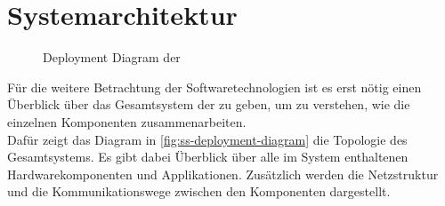 \chapter{Systemarchitektur}
\label{chap:systemarchitektur}

\begin{figure}
    \centering
    
    \caption{Deployment Diagram der \shst{}}
    \label{fig:ss-deployment-diagram}
\end{figure}

Für die weitere Betrachtung der Softwaretechnologien ist es erst nötig einen Überblick über 
das Gesamtsystem der \shst{} zu geben, um zu verstehen, wie die einzelnen Komponenten
zusammenarbeiten.\\
Dafür zeigt das Diagram in \autoref{fig:ss-deployment-diagram} die Topologie des Gesamtsystems.
Es gibt dabei Überblick über alle im System enthaltenen Hardwarekomponenten und Applikationen.
Zusätzlich werden die Netzstruktur und die Kommunikationswege zwischen den Komponenten 
dargestellt.\\

